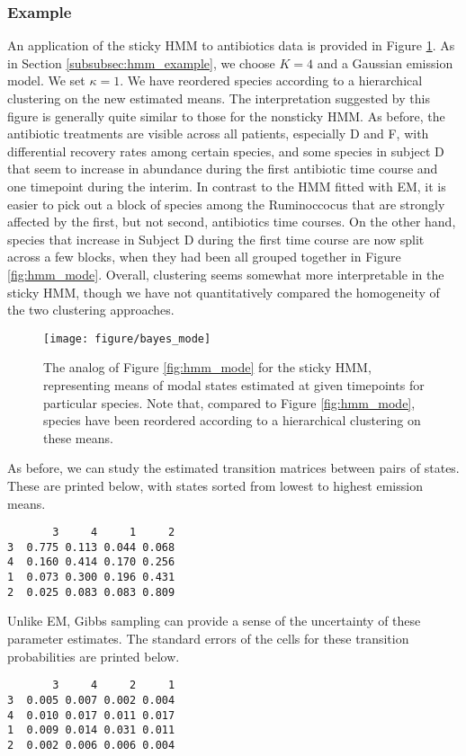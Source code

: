 \documentclass{article}
\begin{document}
\subsubsection{Example}
\label{subsubsec:sticky_hmm_example}

An application of the sticky HMM to antibiotics data is provided in Figure
\ref{fig:bayes_mode}. As in Section \ref{subsubsec:hmm_example}, we choose $K =
4$ and a Gaussian emission model. We set $\kappa = 1$. We have reordered species
according to a hierarchical clustering on the new estimated means. The
interpretation suggested by this figure is generally quite similar to those for
the nonsticky HMM. As before, the antibiotic treatments are visible across all
patients, especially D and F, with differential recovery rates among certain
species, and some species in subject D that seem to increase in abundance during
the first antibiotic time course and one timepoint during the interim. In
contrast to the HMM fitted with EM, it is easier to pick out a block of species
among the Ruminoccocus that are strongly affected by the first, but not second,
antibiotics time courses. On the other hand, species that increase in Subject D
during the first time course are now split across a few blocks, when they had
been all grouped together in Figure \ref{fig:hmm_mode}. Overall, clustering
seems somewhat more interpretable in the sticky HMM, though we have not
quantitatively compared the homogeneity of the two clustering approaches.

\begin{figure}[ht]
  \centering
  \texttt{[image: figure/bayes\_mode]}
  \caption{The analog of Figure \ref{fig:hmm_mode} for the sticky HMM,
    representing means of modal states estimated at given timepoints for
    particular species. Note that, compared to Figure \ref{fig:hmm_mode},
    species have been reordered according to a hierarchical clustering on these
    means. \label{fig:bayes_mode} }
\end{figure}

As before, we can study the estimated transition matrices between pairs of
states. These are printed below, with states sorted from lowest to highest
emission means.
\begin{verbatim}
       3     4     1     2
3  0.775 0.113 0.044 0.068
4  0.160 0.414 0.170 0.256
1  0.073 0.300 0.196 0.431
2  0.025 0.083 0.083 0.809
\end{verbatim}

Unlike EM, Gibbs sampling can provide a sense of the uncertainty of these
parameter estimates. The standard errors of the cells for these transition
probabilities are printed below.
\begin{verbatim}
       3     4     2     1
3  0.005 0.007 0.002 0.004
4  0.010 0.017 0.011 0.017
1  0.009 0.014 0.031 0.011
2  0.002 0.006 0.006 0.004
\end{verbatim}
\end{document}
